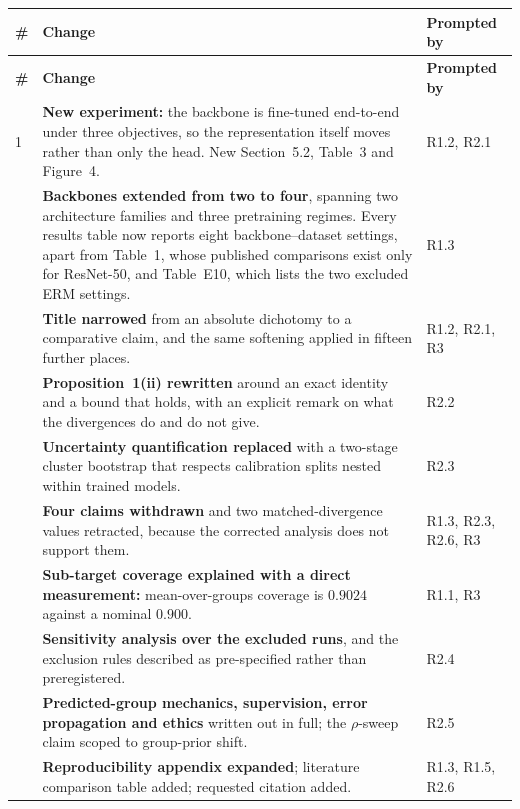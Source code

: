 \documentclass[11pt,a4paper]{article}
\begin{document}
\begin{longtable}{@{}p{0.5em}p{11.4cm}p{2.9cm}@{}}
\toprule
\textbf{\#} & \textbf{Change} & \textbf{Prompted by} \\
\midrule
\endfirsthead
\toprule
\textbf{\#} & \textbf{Change} & \textbf{Prompted by} \\
\midrule
\endhead
1 & \textbf{New experiment:} the backbone is fine-tuned end-to-end under three objectives, so the
representation itself moves rather than only the head. New Section~5.2, Table~3 and Figure~4. & R1.2, R2.1 \\
\addlinespace
2 & \textbf{Backbones extended from two to four}, spanning two architecture families and three
pretraining regimes. Every results table now reports eight backbone--dataset settings, apart from
Table~1, whose published comparisons exist only for ResNet-50, and Table~E10, which lists the two
excluded ERM settings. & R1.3 \\
\addlinespace
3 & \textbf{Title narrowed} from an absolute dichotomy to a comparative claim, and the same
softening applied in fifteen further places. & R1.2, R2.1, R3 \\
\addlinespace
4 & \textbf{Proposition~1(ii) rewritten} around an exact identity and a bound that holds, with an
explicit remark on what the divergences do and do not give. & R2.2 \\
\addlinespace
5 & \textbf{Uncertainty quantification replaced} with a two-stage cluster bootstrap that respects
calibration splits nested within trained models. & R2.3 \\
\addlinespace
6 & \textbf{Four claims withdrawn} and two matched-divergence values retracted, because the
corrected analysis does not support them. & R1.3, R2.3, R2.6, R3 \\
\addlinespace
7 & \textbf{Sub-target coverage explained with a direct measurement:} mean-over-groups coverage is
$0.9024$ against a nominal $0.900$. & R1.1, R3 \\
\addlinespace
8 & \textbf{Sensitivity analysis over the excluded runs}, and the exclusion rules described as
pre-specified rather than preregistered. & R2.4 \\
\addlinespace
9 & \textbf{Predicted-group mechanics, supervision, error propagation and ethics} written out in
full; the $\rho$-sweep claim scoped to group-prior shift. & R2.5 \\
\addlinespace
10 & \textbf{Reproducibility appendix expanded}; literature comparison table added; requested
citation added. & R1.3, R1.5, R2.6 \\
\bottomrule
\end{longtable}
\end{document}
